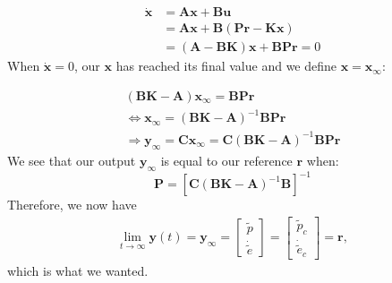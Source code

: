 \begin{align*}
  \dot{\boldsymbol{x}} &= \boldsymbol{Ax} + \boldsymbol{Bu} \\
                       &= \boldsymbol{Ax} +
                         \boldsymbol{B}(\boldsymbol{Pr} -
                         \boldsymbol{Kx}) \\
                       &= (\boldsymbol{A}-\boldsymbol{BK})\boldsymbol{x}
                         + \boldsymbol{BPr} = 0
\end{align*}
When $\boldsymbol{\dot{x}} = 0$, our $\boldsymbol{x}$ has reached its
final value and we define $\boldsymbol{x} = \boldsymbol{x_\infty}$:

\begin{align*}
  (\boldsymbol{BK} - \boldsymbol{A})\boldsymbol{x_\infty} = \boldsymbol{BPr} \\
  \Leftrightarrow \boldsymbol{x_\infty} = (\boldsymbol{BK} - \boldsymbol{A})^{-1}\boldsymbol{BPr} \\
  \Rightarrow \boldsymbol{y_\infty} = \boldsymbol{Cx_\infty} = \boldsymbol{C}(\boldsymbol{BK} - \boldsymbol{A})^{-1}\boldsymbol{BPr}
\end{align*}
We see that our output $\boldsymbol{y_\infty}$ is equal to our reference $\boldsymbol{r}$ when:
\begin{equation}
  \boldsymbol{P} = [\boldsymbol{C}(\boldsymbol{BK} - \boldsymbol{A})^{-1}\boldsymbol{B}]^{-1}
\end{equation}
Therefore, we now have
\begin{align*}
  \lim_{t\to\infty}\boldsymbol{y}(t) = \boldsymbol{y_\infty} =
  \begin{bmatrix}
    \tilde{p} \\
    \dot{\tilde{e}}
  \end{bmatrix}
  =
  \begin{bmatrix}
    \tilde{p}_c \\
    \dot{\tilde{e}}_c
  \end{bmatrix}
  = \boldsymbol{r},
\end{align*}
which is what we wanted.
